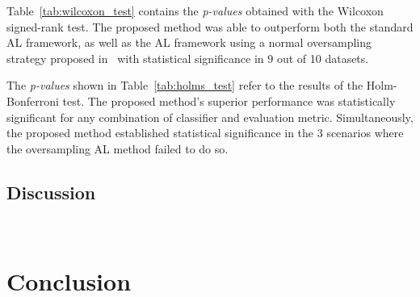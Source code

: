 \documentclass[parskip=full]{scrartcl}
\begin{document}
Table~\ref{tab:wilcoxon_test} contains the \textit{p-values} obtained with the
Wilcoxon signed-rank test. The proposed method was able to outperform both the
standard AL framework, as well as the AL framework using a normal oversampling
strategy proposed in~\cite{Fonseca2021} with statistical significance in 9 out
of 10 datasets.

\begin{table}[H]
	\centering
    \caption{%
        Adjusted p-values using the Wilcoxon signed-rank method. Bold values
        are statistically significant at a level of $\alpha = 0.05$. The null
        hypothesis is that the performance of the proposed framework is
        similar to that of the oversampling or standard framework.
    }\label{tab:wilcoxon_test}
\end{table}

The \textit{p-values} shown in Table~\ref{tab:holms_test} refer to the results
of the Holm-Bonferroni test. The proposed method's superior performance was
statistically significant for any combination of classifier and evaluation
metric. Simultaneously, the proposed method established statistical
significance in the 3 scenarios where the oversampling AL method failed to do
so.

\begin{table}[H]
	\centering
    \caption{%
		Adjusted p-values using the Holm-Bonferroni method. Bold values
        are statistically significant at a level of $\alpha = 0.05$. The 
        null hypothesis is that the tested method does not perform better 
        than the control method (benchmark AL framework).
    }\label{tab:holms_test}
\end{table}




\subsection{Discussion}~\label{sec:sub_discussion}

\section{Conclusion}~\label{sec:conclusion}




\end{document}
